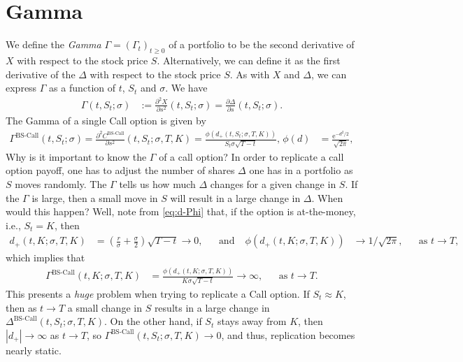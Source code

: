 \documentclass[12pt]{book}
\numberwithin{equation}{chapter}
\theoremstyle{plain}
\numberwithin{theorem}{section}
\theoremstyle{definition}
\numberwithin{exercise}{chapter}
\newcommand{\<}{\langle}
\renewcommand{\>}{\rangle}
\renewcommand{\(}{\left(}
\renewcommand{\)}{\right)}
\renewcommand{\[}{\left[}
\renewcommand{\]}{\right]}
\newcommand\sig{\sigma}
\newcommand\Gam{\Gamma}
\newcommand\Del{\Delta}
\renewcommand\d{\partial}
\newcommand\ee{\mathrm{e}}
\theoremstyle{definition}
\numberwithin{question}{section}
\begin{document}
\section{Gamma}
We define the \textit{Gamma} $\Gamma = (\Gam_t)_{t \geq 0}$ of a portfolio to be the second derivative of $X$ with respect to the stock price $S$.  Alternatively, we can define it as the first derivative of the $\Delta$ with respect to the stock price $S$.  As with $X$ and $\Del$, we can express $\Gamma$ as a function of $t$, $S_t$ and $\sig$.  We have
\begin{align}
\Gamma(t,S_t;\sig)
	&:=	\frac{\d^2 X}{\d s^2}(t,S_t;\sig)
	=		\frac{\d \Del}{\d s}(t,S_t;\sig) .
\end{align}
The Gamma of a single Call option 
is given by
\begin{align}
\Gamma^\text{BS-Call} (t,S_t;\sig)
	&= \frac{\d^2 C^\text{BS-Call}}{\d s^2} (t,S_t;\sig,T,K) = \frac{\phi(d_+(t,S_t;\sig,T,K))}{S_t \sigma \sqrt{T-t}},  &
\phi(d) 
	&= \frac{\ee^{-d^2/2}}{\sqrt{2 \pi}} ,
\end{align}
Why is it important to know the $\Gamma$ of a call option?
In order to replicate a call option payoff, one has to adjust the number of shares $\Delta$ one has in a portfolio as $S$ moves randomly.  The $\Gamma$ tells us how much $\Delta$ changes for a given change in $S$.  If the $\Gamma$ is large, then a small move in $S$ will result in a large change in $\Del$.  When would this happen?
Well, note from \eqref{eq:d-Phi} that, if the option is at-the-money, i.e., $S_t = K$, then
\begin{align}
d_+(t,K;\sig,T,K)
	&= \( \frac{r}{\sig} + \frac{\sig}{2} \) \sqrt{T-t} \to 0 , &
	&\text{and thus}&
\phi(d_+(t,K;\sig,T,K))
	&\to 1/\sqrt{2 \pi} , &
	&\text{as $t \to T$},
\end{align}
which implies that
\begin{align}
\Gamma^\text{BS-Call}(t,K;\sig,T,K)
	&= \frac{\phi(d_+(t,K;\sig,T,K))}{K \sigma \sqrt{T-t}}
	\to \infty , &
	&\text{as $t \to T$}.
\end{align}
This presents a \textit{huge} problem when trying to replicate a Call option. If $S_t \approx K$, then as $t \to T$ a small change in $S$ results in a large change in  $\Delta^\text{BS-Call}(t,S_t;\sig,T,K)$.  On the other hand, if $S_t$ stays away from $K$, then $|d_+| \to \infty$ as $t \to T$, so $\Gamma^\text{BS-Call}(t,S_t;\sig,T,K) \to 0$, and thus, replication becomes nearly static.
\end{document}
